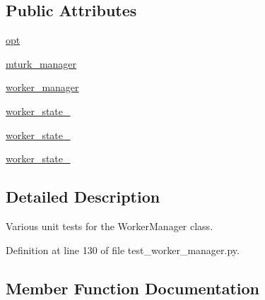 \subsection*{Public Attributes}
\begin{DoxyCompactItemize}
\item 
\hyperlink{classparlai_1_1mturk_1_1core_1_1legacy__2018_1_1test_1_1test__worker__manager_1_1TestWorkerManager_a8345c8a144607e001d530dd0c3082334}{opt}
\item 
\hyperlink{classparlai_1_1mturk_1_1core_1_1legacy__2018_1_1test_1_1test__worker__manager_1_1TestWorkerManager_a053eca3bf966f63d8740b0049102cd2d}{mturk\+\_\+manager}
\item 
\hyperlink{classparlai_1_1mturk_1_1core_1_1legacy__2018_1_1test_1_1test__worker__manager_1_1TestWorkerManager_ae9e288c3b82a1451cb88a800c6d6c7bb}{worker\+\_\+manager}
\item 
\hyperlink{classparlai_1_1mturk_1_1core_1_1legacy__2018_1_1test_1_1test__worker__manager_1_1TestWorkerManager_a3cd35f72a2eafb6bf46de95ab9c2a74c}{worker\+\_\+state\+\_}
\item 
\hyperlink{classparlai_1_1mturk_1_1core_1_1legacy__2018_1_1test_1_1test__worker__manager_1_1TestWorkerManager_a3aa5f117a73e8a4a0947aa675f1fb0e8}{worker\+\_\+state\+\_}
\item 
\hyperlink{classparlai_1_1mturk_1_1core_1_1legacy__2018_1_1test_1_1test__worker__manager_1_1TestWorkerManager_a4b78cfccbd467410a7b86bf3387c92b9}{worker\+\_\+state\+\_}
\end{DoxyCompactItemize}


\subsection{Detailed Description}
\begin{DoxyVerb}Various unit tests for the WorkerManager class.
\end{DoxyVerb}
 

Definition at line 130 of file test\+\_\+worker\+\_\+manager.\+py.



\subsection{Member Function Documentation}
\mbox{\label{classparlai_1_1mturk_1_1core_1_1legacy__2018_1_1test_1_1test__worker__manager_1_1TestWorkerManager_adc02b37bdfeeb628452ff51330eaaafe}} 
